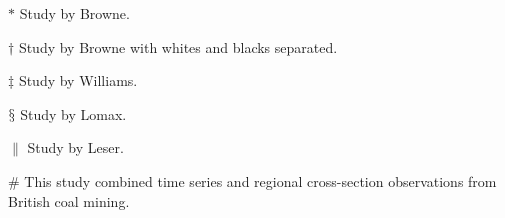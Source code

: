 \documentclass{article}
\begin{document}
\begin{table}[!t]
{\begin{tabular}{p{}p{}p{}p{}p{}p{}p{}}
%
%
%
%
%
%

\hline
\end{tabular}
\raggedright{
\par
$\ast$ Study by Browne.
\par
$\dagger$ Study by Browne with whites and blacks separated.
\par
$\ddagger$ Study by Williams.
\par
$\mathsection$ Study by Lomax.
\par
$\|$ Study by Leser.
\begin{flushleft}
$\#$ This study combined time series and regional cross-section observations from British coal mining.
\end{flushleft}
}
}
\end{table}
\end{document}
